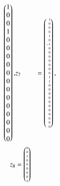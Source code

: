 \begin{beispiel}
{\begin{align*}
\begin{pmatrix*}[r]
 1\\
 0\\
 0\\
 1\\
 0\\
 0\\
 0\\
 0\\
 0\\
 0\\
 0\\
 0\\
 0\\
 0\\
 0\\
 0\\
 0
\end{pmatrix*},
&z_7 %
&=
\tiny
\begin{pmatrix*}[r]
 1\\
 0\\
 0\\
 0\\
 1\\
 0\\
-1\\
 0\\
 0\\
 0\\
 0\\
 0\\
 0\\
 0\\
 1\\
 1\\
 0\\
 0\\
 0\\
 0\\
 0\\
 0\\
 0\\
 0\\
 0\\
 0\\
 0
\end{pmatrix*},\\
z_8 %
&=
\tiny
\begin{pmatrix*}[r]
 0\\
 0\\
 1\\
 0\\
 0\\
 0\\
 0\\
 0\\
 1\\

\end{pmatrix*}
\end{align*}}
\end{beispiel}
